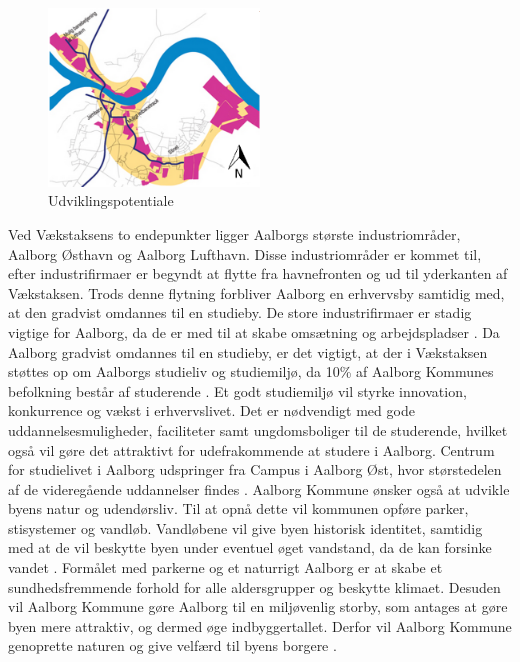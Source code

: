 \begin{figure}[htbp]
	\centering
	\includegraphics[width=0.5\textwidth]{billeder/udvikling.png}
	\caption{Udviklingspotentiale}
	\label{fig:udvikling}
\end{figure}

Ved Vækstaksens to endepunkter ligger Aalborgs største industriområder, Aalborg Østhavn og Aalborg Lufthavn. Disse industriområder er kommet til, efter industrifirmaer er begyndt at flytte fra havnefronten og ud til yderkanten af Vækstaksen. Trods denne flytning forbliver Aalborg en erhvervsby samtidig med, at den gradvist omdannes til en studieby. De store industrifirmaer er stadig vigtige for Aalborg, da de er med til at skabe omsætning og arbejdspladser \citep{kommuneplan3}. 
\newline \indent{     }  Da Aalborg gradvist omdannes til en studieby, er det vigtigt, at der i Vækstaksen støttes op om Aalborgs studieliv og studiemiljø, da 10\% af Aalborg Kommunes befolkning består af studerende \citep{campus}. Et godt studiemiljø vil styrke innovation, konkurrence og vækst i erhvervslivet. Det er nødvendigt med gode uddannelsesmuligheder, faciliteter samt ungdomsboliger til de studerende, hvilket også vil gøre det attraktivt for udefrakommende at studere i Aalborg. Centrum for studielivet i Aalborg udspringer fra Campus i Aalborg Øst, hvor størstedelen af de videregående uddannelser findes \citep{kommuneplan3}. 
\newline
\newline
Aalborg Kommune ønsker også at udvikle byens natur og udendørsliv. Til at opnå dette vil kommunen opføre parker, stisystemer og vandløb. Vandløbene vil give byen historisk identitet, samtidig med at de vil beskytte byen under eventuel øget vandstand, da de kan forsinke vandet \citep{kommuneplan3}. Formålet med parkerne og et naturrigt Aalborg er at skabe et sundhedsfremmende forhold for alle aldersgrupper og beskytte klimaet. Desuden vil Aalborg Kommune gøre Aalborg til en miljøvenlig storby, som antages at gøre byen mere attraktiv, og dermed øge indbyggertallet. Derfor vil Aalborg Kommune genoprette naturen og give velfærd til byens borgere \citep{kommuneplan3}.

